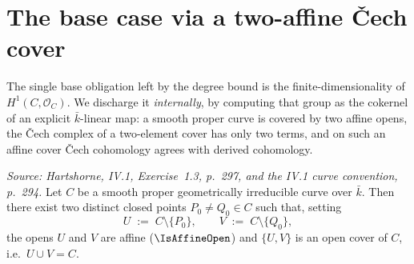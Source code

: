 \section{The base case via a two-affine Čech cover}
\label{sec:SerreFiniteness_cech}

The single base obligation left by the degree bound is the
finite-dimensionality of \(H^1(C, \mathcal O_C)\). We discharge it
\emph{internally}, by computing that group as the cokernel of an
explicit \(\bar k\)-linear map: a smooth proper curve is covered by two
affine opens, the Čech complex of a two-element cover has only two
terms, and on such an affine cover Čech cohomology agrees with derived
cohomology.

\begin{lemma}
  \label{lem:exists_two_affine_cover}
  \textit{Source: Hartshorne, IV.1, Exercise~1.3, p.~297, and the IV.1
  curve convention, p.~294.}
  Let \(C\) be a smooth proper geometrically irreducible curve over
  \(\bar k\). Then there exist two distinct closed points
  \(P_0 \ne Q_0 \in C\) such that, setting
  \[
    U \;:=\; C \setminus \{P_0\}, \qquad V \;:=\; C \setminus \{Q_0\},
  \]
  the opens \(U\) and \(V\) are affine (\(\IsAffineOpen\)) and
  \(\{U, V\}\) is an open cover of \(C\), i.e.\ \(U \cup V = C\).
\end{lemma}

